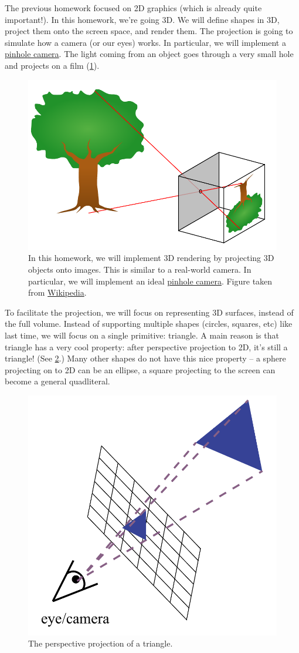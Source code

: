 




The previous homework focused on 2D graphics (which is already quite important!). In this homework, we're going 3D. We will define shapes in 3D, project them onto the screen space, and render them. The projection is going to simulate how a camera (or our eyes) works. In particular, we will implement a \href{https://en.wikipedia.org/wiki/Pinhole_camera}{pinhole camera}. The light coming from an object goes through a very small hole and projects on a film (\cref{fig:pinhole}). 

\begin{figure}[h]
    \centering
    \includegraphics[width=0.5\linewidth]{imgs/pinhole.pdf}
    \caption{In this homework, we will implement 3D rendering by projecting 3D objects onto images. This is similar to a real-world camera. In particular, we will implement an ideal \href{https://en.wikipedia.org/wiki/Pinhole_camera}{pinhole camera}. Figure taken from \href{https://commons.wikimedia.org/wiki/File:Pinhole-camera.svg}{Wikipedia}.}
    \label{fig:pinhole}
\end{figure}

To facilitate the projection, we will focus on representing 3D surfaces, instead of the full volume. Instead of supporting multiple shapes (circles, squares, etc) like last time, we will focus on a single primitive: triangle. A main reason is that triangle has a very cool property: after perspective projection to 2D, it's still a triangle! (See \cref{fig:perspective}.) Many other shapes do not have this nice property -- a sphere projecting on to 2D can be an ellipse, a square projecting to the screen can become a general quadliteral.

\begin{figure}[h]
    \centering
    \includegraphics[width=0.5\linewidth]{imgs/perspective_projection.pdf}
    \caption{The perspective projection of a triangle.}
    \label{fig:perspective}
\end{figure}

